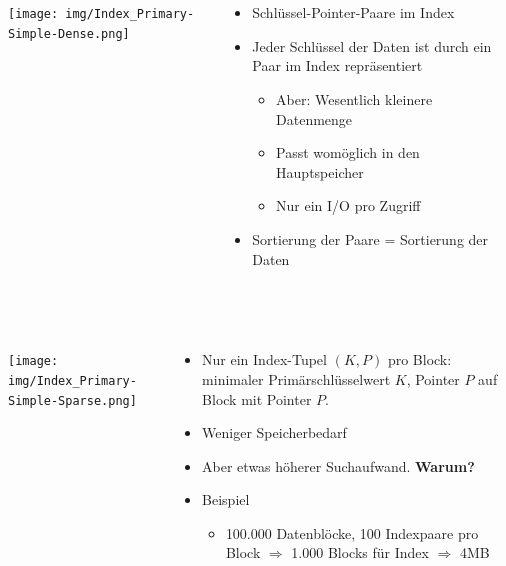 \begin{frame}{\insertsection}
\framesubtitle{\insertsubsection}
\\[4pt]
\begin{columns}[T]
	\begin{column}{.33\textwidth}
		\texttt{[image: img/Index\_Primary-Simple-Dense.png]}
	\end{column}
	\begin{column}{.67\textwidth}
		\begin{itemize}
			\item Schl\"ussel-Pointer-Paare im Index
			\item Jeder Schl\"ussel der Daten ist durch ein Paar im Index repräsentiert
			\begin{itemize}
				\item Aber: Wesentlich kleinere Datenmenge
				\item Passt womöglich in den Hauptspeicher
				\item Nur ein I/O pro Zugriff
			\end{itemize}
			\item Sortierung der Paare = Sortierung der Daten		  
		\end{itemize}
	\end{column}
\end{columns}
\end{frame}

\begin{frame}{\insertsection}
\framesubtitle{\insertsubsection}
\\[4pt]
\begin{columns}[T]
\begin{column}{.33\textwidth}
	\texttt{[image: img/Index\_Primary-Simple-Sparse.png]}
\end{column}
\begin{column}{.67\textwidth}
	\begin{itemize}
		\item Nur ein Index-Tupel $(K,P)$ pro Block: minimaler Prim\"arschl\"usselwert $K$, Pointer $P$ auf Block mit Pointer $P$.
		\item Weniger Speicherbedarf
		\item Aber etwas h\"oherer Suchaufwand. \textbf{Warum?}\\[8pt]
		\item Beispiel
		\begin{itemize}
			\item 100.000 Datenblöcke, 100 Indexpaare pro Block $\Rightarrow$ 1.000 Blocks für Index  $\Rightarrow$ 4MB
		\end{itemize}
	\end{itemize}
\end{column}
\end{columns}
\end{frame}

